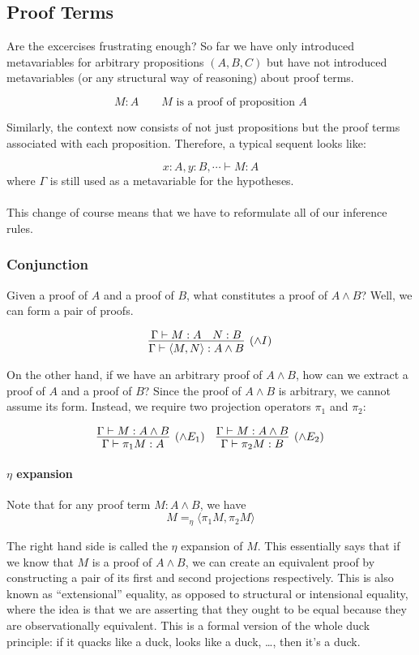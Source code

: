 \documentclass[a4paper]{article}
\begin{document}
\subsection{Proof Terms}
Are the excercises frustrating enough? So far we have only introduced
metavariables for arbitrary propositions $(A, B, C)$ but have not introduced
metavariables (or any structural way of reasoning) about proof terms.

$$M : A \qquad M \text{ is a proof of proposition } A$$

Similarly, the context now consists of not just propositions but the proof terms
associated with each proposition. Therefore, a typical sequent looks like:

$$x:A, y:B, \cdots \vdash M : A$$
where $\Gamma$ is still used as a metavariable for the hypotheses.

\paragraph{}
This change of course means that we have to reformulate all of our inference
rules.

\subsubsection{Conjunction}
Given a proof of $A$ and a proof of $B$, what constitutes a proof of $A \land
B$? Well, we can form a pair of proofs.

$$\infer[(\land I)]{\Gamma \vdash \langle M,N \rangle : A \land B}{\Gamma \vdash M: A & N : B}$$

On the other hand, if we have an arbitrary proof of $A \land B$, how can we
extract a proof of $A$ and a proof of $B$? Since the proof of $A \land B$ is
arbitrary, we cannot assume its form. Instead, we require two projection
operators $\pi_1$ and $\pi_2$:

\[
  \infer[(\land E_1)]{\Gamma \vdash \pi_1 M : A}{\Gamma \vdash M : A \land B} \quad
  \infer[(\land E_2)]{\Gamma \vdash \pi_2 M : B}{\Gamma \vdash M : A \land B}
\]

\paragraph{$\eta$ expansion}
Note that for any proof term $M : A \land B$, we have
$$M =_{\eta} \langle \pi_1 M, \pi_2 M \rangle$$

The right hand side is called the $\eta$ expansion of $M$. This essentially says
that if we know that $M$ is a proof of $A \land B$, we can create an equivalent
proof by constructing a pair of its first and second projections respectively.
This is also known as ``extensional'' equality, as opposed to structural or
intensional equality, where the idea is that we are asserting that they ought to
be equal because they are observationally equivalent. This is a formal version
of the whole duck principle: if it quacks like a duck, looks like a duck,
\ldots, then it's a duck.
\end{document}
